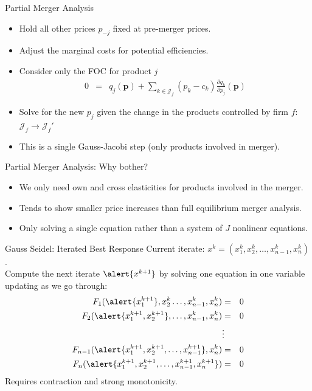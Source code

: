 \documentclass[xcolor=pdftex,dvipsnames,table,mathserif]{beamer}
\begin{document}
\begin{frame}{Partial Merger Analysis}
\begin{itemize}
\item Hold all other prices $p_{-j}$ fixed at \alert{pre-merger} prices.
\item Adjust the marginal costs for potential efficiencies.
\item Consider only the FOC for product $j$
\begin{eqnarray*}
0&=& q_j(\mathbf{p}) + \sum_{k \in \mathcal{J}_f} (p_k - c_k) \frac{\partial q_{k}}{\partial p_j}(\mathbf{p})
\end{eqnarray*}
\item Solve for the new $p_j$ given the change in the products controlled by firm $f$: $\mathcal{J}_f \rightarrow \mathcal{J}_f'$
\item This is a single Gauss-Jacobi step (only products involved in merger).
\end{itemize}
\end{frame} 

\begin{frame}{Partial Merger Analysis: Why bother?}
\begin{itemize}
\item We only need own and cross elasticities for products involved in the merger.
\item Tends to show smaller price increases than full equilibrium merger analysis.
\item Only solving a single equation rather than a system of $J$ nonlinear equations.
\end{itemize}
\end{frame} 


\begin{frame}{Gauss Seidel: Iterated Best Response}
Current iterate: $x^k = (x_1^k,x_2^k,\ldots,x_{n-1}^k,x_n^k)$.\\
\vspace{0.5cm}
Compute the next iterate $\alert{x^{k+1}}$ by solving one equation in one variable updating as we go through:\begin{eqnarray*}
F_1 (\alert{x_1^{k+1}},x_2^k \ldots, x_{n-1}^k, x_n^k)  &=& 0 \\
F_2  (\alert{x_1^{k+1},x_2^{k+1}},\ldots,x_{n-1}^k,x_n^k)  &=& 0\\
&\vdots&\\ 
F_{n-1}  (\alert{x_1^{k+1},x_2^{k+1},\ldots,x_{n-1}^{k+1}},x_n^k)  &=& 0\\
F_n  (\alert{x_1^{k+1},x_2^{k+1},\ldots,x_{n-1}^{k+1}, x_n^{k+1}})  &=& 0\\
\end{eqnarray*}
Requires contraction and strong monotonicity.
\end{frame} 
\end{document}
